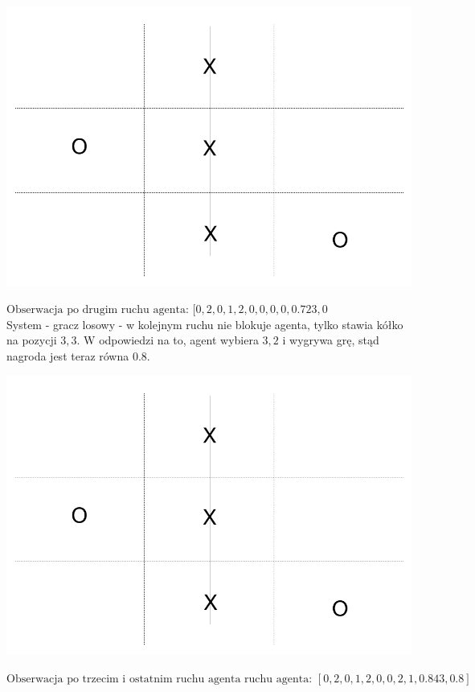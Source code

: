 \documentclass[licencjacka]{pracamgr}
\begin{document}
\begin{flushleft}
	\includegraphics [scale=0.2] {ttt_7.png}
\end{flushleft} 
$\text{Obserwacja po drugim ruchu agenta:  }[0, 2, 0, 1, 2, 0, 0, 0, 0, 0.723, 0$\\

System - gracz losowy - w kolejnym ruchu nie blokuje agenta, tylko stawia kółko na pozycji $3,3$. W odpowiedzi na to, agent wybiera $3,2$ i wygrywa grę, stąd nagroda jest teraz równa $0.8$.

\begin{flushleft}
	\includegraphics [scale=0.2] {ttt_7.png}
\end{flushleft} 
$\text{Obserwacja po trzecim i ostatnim ruchu agenta ruchu agenta:  }[0, 2, 0, 1, 2, 0, 0, 2, 1, 0.843, 0.8]$\\
\end{document}
